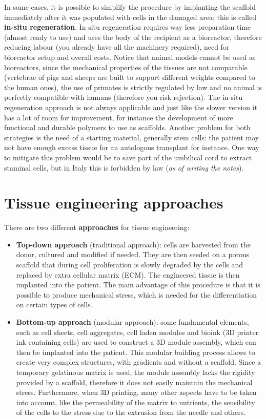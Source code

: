   In some cases, it is possible to simplify the procedure by implanting the scaffold immediately after it was populated with cells in the damaged area; this is called \textbf{in-situ regeneration}.
  In situ regeneration requires way less preparation time (almost ready to use) and uses the body of the recipient as a bioreactor, therefore reducing labour (you already have all the machinery required), need for bioreactor setup and overall costs.
  Notice that animal models cannot be used as bioreactors, since the mechanical properties of the tissues are not comparable (vertebrae of pigs and sheeps are built to support different weights compared to the human ones), the use of primates is strictly regulated by law and no animal is perfectly compatible with humans (therefore you risk rejection).
  The in-situ regeneration approach is not always applicable and just like the slower version it has a lot of room for improvement, for instance the development of more functional and durable polymers to use as scaffolds.
  Another problem for both strategies is the need of a starting material, generally stem cells: the patient may not have enough excess tissue for an autologous transplant for instance.
  One way to mitigate this problem would be to save part of the umbilical cord to extract staminal cells, but in Italy this is forbidden by law (\textit{as of writing the notes}).

\section{Tissue engineering approaches}
There are two different \textbf{approaches} for tissue engineering:

\begin{multicols}{2}
  \begin{itemize}
    \item \textbf{Top-down approach} (traditional approach): cells are harvested from the donor, cultured and modified if needed. They are then seeded on a porous scaffold that during cell proliferation is slowly degraded by the cells and replaced by extra cellular matrix (ECM). The engineered tissue is then implanted into the patient. The main advantage of this procedure is that it is possible to produce mechanical stress, which is needed for the differentiation on certain types of cells.
    \item \textbf{Bottom-up approach} (modular approach): some fundamental elements, such as cell sheets, cell aggregates, cell laden modules and bioink (3D printer ink containing cells) are used to construct a 3D module assembly, which can then be implanted into the patient. This modular building process allows to create very complex structures, with gradients and without a scaffold. Since a temporary gelatinous matrix is used, the module assembly lacks the rigidity provided by a scaffold, therefore it does not easily maintain the mechanical stress. Furthermore, when 3D printing, many other aspects have to be taken into account, like the permeability of the matrix to nutrients, the sensibility of the cells to the stress due to the extrusion from the needle and others.
  \end{itemize}
\end{multicols}
